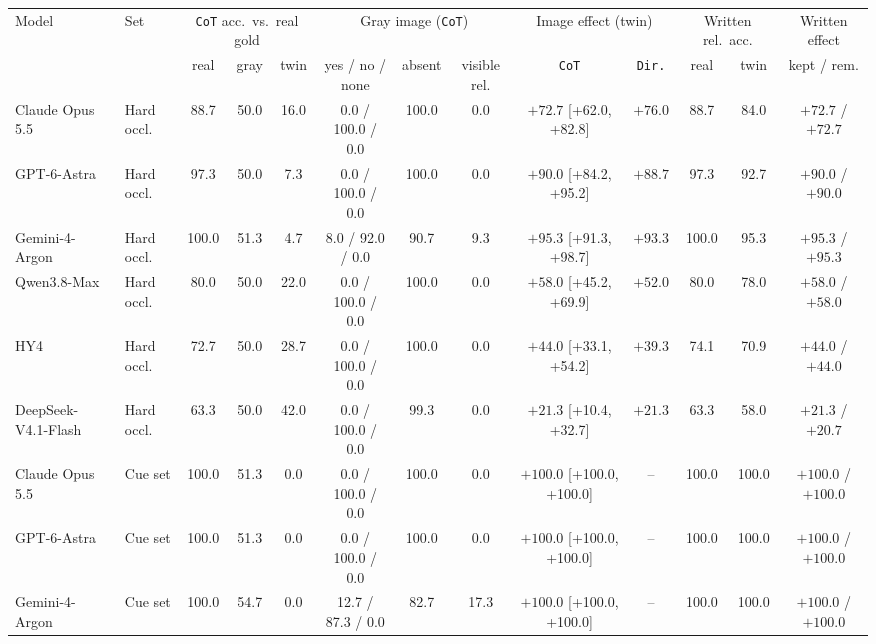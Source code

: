 \begin{tabular}{llccccccccccc}
\toprule
Model & Set & \multicolumn{3}{c}{\texttt{CoT} acc.\ vs.\ real gold} & \multicolumn{3}{c}{Gray image (\texttt{CoT})} & \multicolumn{2}{c}{Image effect (twin)} & \multicolumn{2}{c}{Written rel.\ acc.} & Written effect \\
\cmidrule(lr){3-5}\cmidrule(lr){6-8}\cmidrule(lr){9-10}\cmidrule(lr){11-12}
 & & real & gray & twin & yes / no / none & absent & visible rel. & \texttt{CoT} & \texttt{Dir.} & real & twin & kept / rem. \\
\midrule
Claude Opus 5.5 & Hard occl. & 88.7 & 50.0 & 16.0 & 0.0 / 100.0 / 0.0 & 100.0 & 0.0 & $+72.7$ {\scriptsize[+62.0, +82.8]} & $+76.0$ & 88.7 & 84.0 & $+72.7$ / $+72.7$ \\
GPT-6-Astra & Hard occl. & 97.3 & 50.0 & 7.3 & 0.0 / 100.0 / 0.0 & 100.0 & 0.0 & $+90.0$ {\scriptsize[+84.2, +95.2]} & $+88.7$ & 97.3 & 92.7 & $+90.0$ / $+90.0$ \\
Gemini-4-Argon & Hard occl. & 100.0 & 51.3 & 4.7 & 8.0 / 92.0 / 0.0 & 90.7 & 9.3 & $+95.3$ {\scriptsize[+91.3, +98.7]} & $+93.3$ & 100.0 & 95.3 & $+95.3$ / $+95.3$ \\
Qwen3.8-Max & Hard occl. & 80.0 & 50.0 & 22.0 & 0.0 / 100.0 / 0.0 & 100.0 & 0.0 & $+58.0$ {\scriptsize[+45.2, +69.9]} & $+52.0$ & 80.0 & 78.0 & $+58.0$ / $+58.0$ \\
HY4 & Hard occl. & 72.7 & 50.0 & 28.7 & 0.0 / 100.0 / 0.0 & 100.0 & 0.0 & $+44.0$ {\scriptsize[+33.1, +54.2]} & $+39.3$ & 74.1 & 70.9 & $+44.0$ / $+44.0$ \\
DeepSeek-V4.1-Flash & Hard occl. & 63.3 & 50.0 & 42.0 & 0.0 / 100.0 / 0.0 & 99.3 & 0.0 & $+21.3$ {\scriptsize[+10.4, +32.7]} & $+21.3$ & 63.3 & 58.0 & $+21.3$ / $+20.7$ \\
\midrule
Claude Opus 5.5 & Cue set & 100.0 & 51.3 & 0.0 & 0.0 / 100.0 / 0.0 & 100.0 & 0.0 & $+100.0$ {\scriptsize[+100.0, +100.0]} & -- & 100.0 & 100.0 & $+100.0$ / $+100.0$ \\
GPT-6-Astra & Cue set & 100.0 & 51.3 & 0.0 & 0.0 / 100.0 / 0.0 & 100.0 & 0.0 & $+100.0$ {\scriptsize[+100.0, +100.0]} & -- & 100.0 & 100.0 & $+100.0$ / $+100.0$ \\
Gemini-4-Argon & Cue set & 100.0 & 54.7 & 0.0 & 12.7 / 87.3 / 0.0 & 82.7 & 17.3 & $+100.0$ {\scriptsize[+100.0, +100.0]} & -- & 100.0 & 100.0 & $+100.0$ / $+100.0$ \\

\end{tabular}
